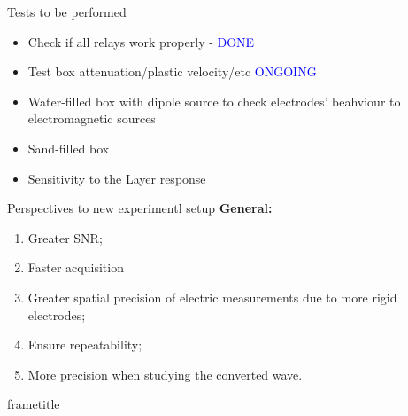 \message{ !name(presentation.tex)}\documentclass[utf8]{beamer}
\begin{document}
%
\begin{frame}{Tests to be performed}
	\begin{itemize}
		\item Check if all relays work properly - \textcolor{blue}{DONE}
		\item Test box attenuation/plastic velocity/etc \textcolor{blue}{ONGOING}
		\item Water-filled box with dipole source to check electrodes' beahviour to electromagnetic sources
		\item Sand-filled box
		\item Sensitivity to the Layer response 
	\end{itemize}
\end{frame}
%
\begin{frame}{Perspectives to new experimentl setup}
	\textbf{General:}
	\begin{enumerate}
		\item Greater SNR;
		\item Faster acquisition
		\item Greater spatial precision of electric measurements due to more rigid electrodes;
		\item Ensure repeatability;
		\item More precision when studying the converted wave.
	\end{enumerate}
\end{frame}
  
  \begin{frame}{}	
	\centering 
	\begin{beamercolorbox}[wd=\paperwidth, ht=1.2cm]{frametitle} 
        \end{beamercolorbox}
  \end{frame}

\end{document}

